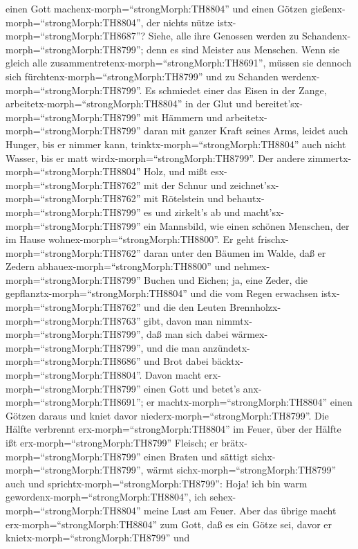 einen Gott machenx-morph=``strongMorph:TH8804'' und einen Götzen
gießenx-morph=``strongMorph:TH8804'', der nichts nütze
istx-morph=``strongMorph:TH8687''?  Siehe, alle ihre
Genossen werden zu Schandenx-morph=``strongMorph:TH8799''; denn es sind
Meister aus Menschen. Wenn sie gleich alle
zusammentretenx-morph=``strongMorph:TH8691'', müssen sie dennoch sich
fürchtenx-morph=``strongMorph:TH8799'' und zu Schanden
werdenx-morph=``strongMorph:TH8799''.  Es schmiedet einer
das Eisen in der Zange, arbeitetx-morph=``strongMorph:TH8804'' in der
Glut und bereitet'sx-morph=``strongMorph:TH8799'' mit Hämmern und
arbeitetx-morph=``strongMorph:TH8799'' daran mit ganzer Kraft seines
Arms, leidet auch Hunger, bis er nimmer kann,
trinktx-morph=``strongMorph:TH8804'' auch nicht Wasser, bis er matt
wirdx-morph=``strongMorph:TH8799''.  Der andere
zimmertx-morph=``strongMorph:TH8804'' Holz, und mißt
esx-morph=``strongMorph:TH8762'' mit der Schnur und
zeichnet'sx-morph=``strongMorph:TH8762'' mit Rötelstein und
behautx-morph=``strongMorph:TH8799'' es und zirkelt's ab und
macht'sx-morph=``strongMorph:TH8799'' ein Mannsbild, wie einen schönen
Menschen, der im Hause wohnex-morph=``strongMorph:TH8800''.
 Er geht frischx-morph=``strongMorph:TH8762'' daran unter
den Bäumen im Walde, daß er Zedern abhauex-morph=``strongMorph:TH8800''
und nehmex-morph=``strongMorph:TH8799'' Buchen und Eichen; ja, eine
Zeder, die gepflanztx-morph=``strongMorph:TH8804'' und die vom Regen
erwachsen istx-morph=``strongMorph:TH8762''  und die den
Leuten Brennholzx-morph=``strongMorph:TH8763'' gibt, davon man
nimmtx-morph=``strongMorph:TH8799'', daß man sich dabei
wärmex-morph=``strongMorph:TH8799'', und die man
anzündetx-morph=``strongMorph:TH8686'' und Brot dabei
bäcktx-morph=``strongMorph:TH8804''. Davon macht
erx-morph=``strongMorph:TH8799'' einen Gott und betet's
anx-morph=``strongMorph:TH8691''; er machtx-morph=``strongMorph:TH8804''
einen Götzen daraus und kniet davor
niederx-morph=``strongMorph:TH8799''.  Die Hälfte verbrennt
erx-morph=``strongMorph:TH8804'' im Feuer, über der Hälfte ißt
erx-morph=``strongMorph:TH8799'' Fleisch; er
brätx-morph=``strongMorph:TH8799'' einen Braten und sättigt
sichx-morph=``strongMorph:TH8799'', wärmt
sichx-morph=``strongMorph:TH8799'' auch und
sprichtx-morph=``strongMorph:TH8799'': Hoja! ich bin warm
gewordenx-morph=``strongMorph:TH8804'', ich
sehex-morph=``strongMorph:TH8804'' meine Lust am Feuer. 
Aber das übrige macht erx-morph=``strongMorph:TH8804'' zum Gott, daß es
ein Götze sei, davor er knietx-morph=``strongMorph:TH8799'' und

